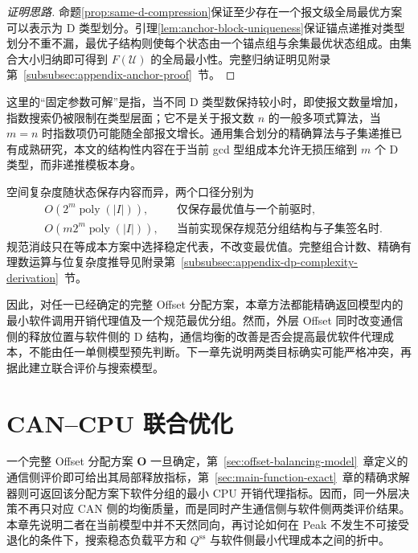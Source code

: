 \documentclass[UTF8,a4paper,twoside,zihao=-4]{ctexart}
\numberwithin{equation}{section}
\numberwithin{figure}{section}
\numberwithin{table}{section}
\theoremstyle{definition}
\numberwithin{algocf}{section}
\begin{document}
\begin{proof}[\normalfont 证明思路]
命题\ref{prop:same-d-compression}保证至少存在一个报文级全局最优方案可以表示为 D 类型划分。引理\ref{lem:anchor-block-uniqueness}保证锚点递推对类型划分不重不漏，最优子结构则使每个状态由一个锚点组与余集最优状态组成。由集合大小归纳即可得到 $F(\mathcal U)$ 的全局最小性。完整归纳证明见附录第~\ref{subsubsec:appendix-anchor-proof}~节。
\end{proof}

这里的“固定参数可解”是指，当不同 D 类型数保持较小时，即使报文数量增加，指数搜索仍被限制在类型层面\cite{downey2013,mnich2015}；它不是关于报文数 $n$ 的一般多项式算法，当 $m=n$ 时指数项仍可能随全部报文增长。通用集合划分的精确算法与子集递推已有成熟研究\cite{bjorklund2009}，本文的结构性内容在于当前 gcd 型组成本允许无损压缩到 $m$ 个 D 类型，而非递推模板本身。

空间复杂度随状态保存内容而异，两个口径分别为
\begin{equation}
 \begin{aligned}
  &O\!\left(2^m\operatorname{poly}(|I|)\right),
  &&\text{仅保存最优值与一个前驱时},\\
  &O\!\left(m2^m\operatorname{poly}(|I|)\right),
  &&\text{当前实现保存规范分组结构与子集签名时}.
 \end{aligned}
\label{eq:fixed-offset-space-bounds}
\end{equation}
规范消歧只在等成本方案中选择稳定代表，不改变最优值。完整组合计数、精确有理数运算与位复杂度推导见附录第~\ref{subsubsec:appendix-dp-complexity-derivation}~节。

因此，对任一已经确定的完整 Offset 分配方案，本章方法都能精确返回模型内的最小软件调用开销代理值及一个规范最优分组。然而，外层 Offset 同时改变通信侧的释放位置与软件侧的 D 结构，通信均衡的改善是否会提高最优软件代理成本，不能由任一单侧模型预先判断。下一章先说明两类目标确实可能严格冲突，再据此建立联合评价与搜索模型。
\clearpage
\section{CAN--CPU 联合优化}
\label{sec:can-cpu-joint}

一个完整 Offset 分配方案 $\boldsymbol O$ 一旦确定，第~\ref{sec:offset-balancing-model}~章定义的通信侧评价即可给出其局部释放指标，第~\ref{sec:main-function-exact}~章的精确求解器则可返回该分配方案下软件分组的最小 CPU 开销代理指标。因而，同一外层决策不再只对应 CAN 侧的均衡质量，而是同时产生通信侧与软件侧两类评价结果。本章先说明二者在当前模型中并不天然同向，再讨论如何在 Peak 不发生不可接受退化的条件下，搜索稳态负载平方和 $Q^{\mathrm{ss}}$ 与软件侧最小代理成本之间的折中。
\end{document}
